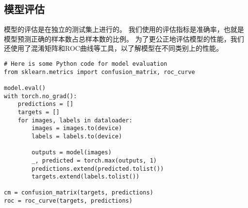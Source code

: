 \subsection{模型评估}\label{subsec:model-evaluation}
模型的评估是在独立的测试集上进行的。
我们使用的评估指标是准确率，也就是模型预测正确的样本数占总样本数的比例。
为了更公正地评估模型的性能，我们还使用了混淆矩阵和ROC曲线等工具，以了解模型在不同类别上的性能。\par
\begin{verbatim}
# Here is some Python code for model evaluation
from sklearn.metrics import confusion_matrix, roc_curve

model.eval()
with torch.no_grad():
    predictions = []
    targets = []
    for images, labels in dataloader:
        images = images.to(device)
        labels = labels.to(device)

        outputs = model(images)
        _, predicted = torch.max(outputs, 1)
        predictions.extend(predicted.tolist())
        targets.extend(labels.tolist())

cm = confusion_matrix(targets, predictions)
roc = roc_curve(targets, predictions)
\end{verbatim}
